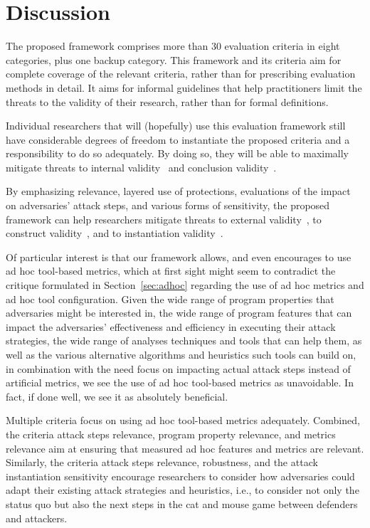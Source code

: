 \section{Discussion}
\label{sec:discussion}

The proposed framework comprises more than 30 evaluation criteria in eight categories, plus one backup category. This framework and its criteria aim for complete coverage of the relevant criteria, rather than for prescribing evaluation methods in detail. It aims for informal guidelines that help practitioners limit the threats to the validity of their research, rather than for formal definitions. 

Individual researchers that will (hopefully) use this evaluation framework still have considerable degrees of freedom to instantiate the proposed criteria and a responsibility to do so adequately. By doing so, they will be able to maximally mitigate threats to internal validity~\cite{Wohlin} and conclusion validity~\cite{Wohlin}. 

By emphasizing relevance, layered use of protections, evaluations of the impact on adversaries' attack steps, and various forms of sensitivity, the proposed framework can help researchers mitigate threats to external validity~\cite{Wohlin}, to construct validity~\cite{Wohlin}, and to instantiation validity~\cite{lukyanenko2014instantiation}.

Of particular interest is that our framework allows, and even encourages to use ad hoc tool-based metrics, which at first sight might seem to contradict the critique formulated in Section~\ref{sec:adhoc} regarding the use of ad hoc metrics and ad hoc tool configuration. Given the wide range of program properties that adversaries might be interested in, the wide range of program features that can impact the adversaries' effectiveness and efficiency in executing their attack strategies, the wide range of analyses techniques and tools that can help them, as well as the various alternative algorithms and heuristics such tools can build on, in combination with the need focus on impacting actual attack steps instead of artificial metrics, we see the use of ad hoc tool-based metrics as unavoidable. In fact, if done well, we see it as absolutely beneficial. 

Multiple criteria focus on using ad hoc tool-based metrics adequately. Combined, the criteria attack steps relevance, program property relevance, and metrics relevance aim at ensuring that measured ad hoc features and metrics are relevant. Similarly, the criteria attack steps relevance, robustness, and the attack instantiation sensitivity encourage researchers to consider how adversaries could adapt their existing attack strategies and heuristics, i.e., to consider not only the status quo but also the next steps in the cat and mouse game between defenders and attackers.

